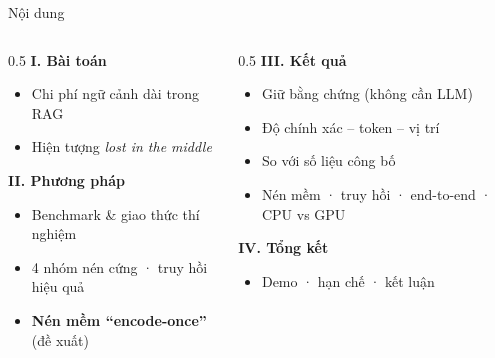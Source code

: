\documentclass[aspectratio=169,11pt]{beamer}
\begin{document}
\begin{frame}{Nội dung}
  \begin{columns}[T]
    \begin{column}{0.5\textwidth}
      \textbf{\color{hustred}I. Bài toán}
      \begin{itemize}\setlength\itemsep{0.2em}
        \item Chi phí ngữ cảnh dài trong RAG
        \item Hiện tượng \emph{lost in the middle}
      \end{itemize}
      \vspace{0.6em}
      \textbf{\color{hustred}II. Phương pháp}
      \begin{itemize}\setlength\itemsep{0.2em}
        \item Benchmark \& giao thức thí nghiệm
        \item 4 nhóm nén cứng · truy hồi hiệu quả
        \item \textbf{Nén mềm ``encode-once''} (đề xuất)
      \end{itemize}
    \end{column}
    \begin{column}{0.5\textwidth}
      \textbf{\color{hustred}III. Kết quả}
      \begin{itemize}\setlength\itemsep{0.2em}
        \item Giữ bằng chứng (không cần LLM)
        \item Độ chính xác -- token -- vị trí
        \item So với số liệu công bố
        \item Nén mềm · truy hồi · end-to-end · CPU vs GPU
      \end{itemize}
      \vspace{0.6em}
      \textbf{\color{hustred}IV. Tổng kết}
      \begin{itemize}\setlength\itemsep{0.2em}
        \item Demo · hạn chế · kết luận
      \end{itemize}
    \end{column}
  \end{columns}
\end{frame}
\end{document}
